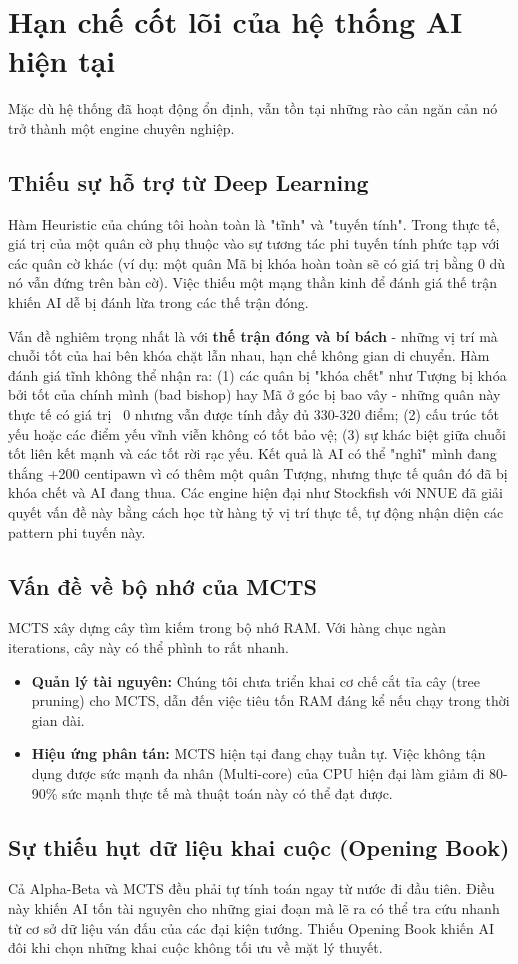 \section{Hạn chế cốt lõi của hệ thống AI hiện tại}

Mặc dù hệ thống đã hoạt động ổn định, vẫn tồn tại những rào cản ngăn cản nó trở thành một engine chuyên nghiệp.

\subsection{Thiếu sự hỗ trợ từ Deep Learning}
Hàm Heuristic của chúng tôi hoàn toàn là "tĩnh" và "tuyến tính". Trong thực tế, giá trị của một quân cờ phụ thuộc vào sự tương tác phi tuyến tính phức tạp với các quân cờ khác (ví dụ: một quân Mã bị khóa hoàn toàn sẽ có giá trị bằng 0 dù nó vẫn đứng trên bàn cờ). Việc thiếu một mạng thần kinh để đánh giá thế trận khiến AI dễ bị đánh lừa trong các thế trận đóng.

Vấn đề nghiêm trọng nhất là với \textbf{thế trận đóng và bí bách} - những vị trí mà chuỗi tốt của hai bên khóa chặt lẫn nhau, hạn chế không gian di chuyển. Hàm đánh giá tĩnh không thể nhận ra: (1) các quân bị "khóa chết" như Tượng bị khóa bởi tốt của chính mình (bad bishop) hay Mã ở góc bị bao vây - những quân này thực tế có giá trị ~0 nhưng vẫn được tính đầy đủ 330-320 điểm; (2) cấu trúc tốt yếu hoặc các điểm yếu vĩnh viễn không có tốt bảo vệ; (3) sự khác biệt giữa chuỗi tốt liên kết mạnh và các tốt rời rạc yếu. Kết quả là AI có thể "nghĩ" mình đang thắng +200 centipawn vì có thêm một quân Tượng, nhưng thực tế quân đó đã bị khóa chết và AI đang thua. Các engine hiện đại như Stockfish với NNUE đã giải quyết vấn đề này bằng cách học từ hàng tỷ vị trí thực tế, tự động nhận diện các pattern phi tuyến này.

\subsection{Vấn đề về bộ nhớ của MCTS}
MCTS xây dựng cây tìm kiếm trong bộ nhớ RAM. Với hàng chục ngàn iterations, cây này có thể phình to rất nhanh. 
\begin{itemize}
    \item \textbf{Quản lý tài nguyên:} Chúng tôi chưa triển khai cơ chế cắt tỉa cây (tree pruning) cho MCTS, dẫn đến việc tiêu tốn RAM đáng kể nếu chạy trong thời gian dài.
    \item \textbf{Hiệu ứng phân tán:} MCTS hiện tại đang chạy tuần tự. Việc không tận dụng được sức mạnh đa nhân (Multi-core) của CPU hiện đại làm giảm đi 80-90\% sức mạnh thực tế mà thuật toán này có thể đạt được.
\end{itemize}

\subsection{Sự thiếu hụt dữ liệu khai cuộc (Opening Book)}
Cả Alpha-Beta và MCTS đều phải tự tính toán ngay từ nước đi đầu tiên. Điều này khiến AI tốn tài nguyên cho những giai đoạn mà lẽ ra có thể tra cứu nhanh từ cơ sở dữ liệu ván đấu của các đại kiện tướng. Thiếu Opening Book khiến AI đôi khi chọn những khai cuộc không tối ưu về mặt lý thuyết.
